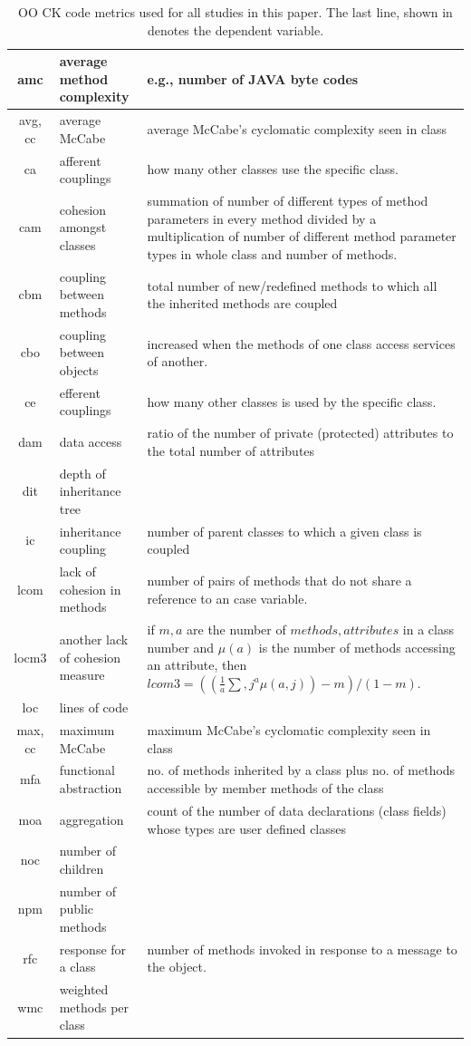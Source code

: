 \documentclass[sigconf,review, anonymous]{acmart}
\theoremstyle{break}
\theoremstyle{break}
\begin{document}
 \begin{table}[!t]
\renewcommand{\baselinestretch}{0.8}\begin{center}
\caption{OO CK code metrics used for all studies in this paper.
The last line, shown in denotes the dependent variable.}
\label{fig:ck}
{\small
\begin{tabular}{c|l|p{4.4in}}
amc & average method complexity & e.g., number of JAVA byte codes\\
\hline
avg, cc & average McCabe & average McCabe's cyclomatic complexity seen
in class\\
\hline
ca & afferent couplings & how many other classes use the specific
class. \\
\hline
cam & cohesion amongst classes & summation of number of different
types of method parameters in every method divided by a multiplication
of number of different method parameter types in whole class and
number of methods. \\
\hline
cbm &coupling between methods & total number of new/redefined methods
to which all the inherited methods are coupled\\
\hline
cbo & coupling between objects & increased when the methods of one
class access services of another.\\
\hline
ce & efferent couplings & how many other classes is used by the
specific class. \\
\hline
dam & data access & ratio of the number of private (protected)
attributes to the total number of attributes\\
\hline
dit & depth of inheritance tree &\\
\hline
ic & inheritance coupling & number of parent classes to which a given
class is coupled
\\
\hline
lcom & lack of cohesion in methods &number of pairs of methods that do
not share a reference to an case variable.\\
\hline
locm3 & another lack of cohesion measure & if $m,a$ are the number of
$methods,attributes$
in a class number and $\mu(a)$ is the number of methods accessing an
attribute,
then
$lcom3=((\frac{1}{a} \sum, j^a \mu(a, j)) - m)/ (1-m)$.
\\
\hline
loc & lines of code &\\
\hline
max, cc & maximum McCabe & maximum McCabe's cyclomatic complexity seen
in class\\
\hline
mfa & functional abstraction & no. of methods inherited by a class
plus no. of methods accessible by member methods of the
class\\
\hline
moa & aggregation & count of the number of data declarations (class
fields) whose types are user defined classes\\
\hline
noc & number of children &\\
\hline
npm & number of public methods & \\
\hline
rfc & response for a class &number of methods invoked in response to
a message to the object.\\
\hline
wmc & weighted methods per class &\\
\hline
 

\end{tabular}}
\end{center}
\end{table}
\end{document}
